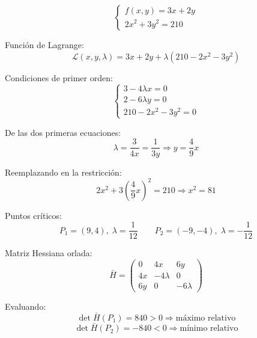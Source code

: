 \begin{Ejer}

\[
\begin{cases}
f(x,y)=3x+2y\\
2x^2+3y^2=210
\end{cases}
\]

Funci\'on de Lagrange:
\[
\mathcal{L}(x,y,\lambda)=3x+2y+\lambda(210-2x^2-3y^2)
\]

Condiciones de primer orden:
\[
\begin{cases}
3-4\lambda x=0\\
2-6\lambda y=0\\
210-2x^2-3y^2=0
\end{cases}
\]

De las dos primeras ecuaciones:
\[
\lambda=\frac{3}{4x}=\frac{1}{3y} \Rightarrow y=\frac{4}{9}x
\]

Reemplazando en la restricci\'on:
\[
2x^2+3\left(\frac{4}{9}x\right)^2=210
\Rightarrow x^2=81
\]

Puntos cr\'iticos:
\[
P_1=(9,4),\;\lambda=\frac{1}{12}
\qquad
P_2=(-9,-4),\;\lambda=-\frac{1}{12}
\]

Matriz Hessiana orlada:
\[
\bar H=
\begin{pmatrix}
0 & 4x & 6y\\
4x & -4\lambda & 0\\
6y & 0 & -6\lambda
\end{pmatrix}
\]

Evaluando:
\[
\det\bar H(P_1)=840>0 \Rightarrow \text{m\'aximo relativo}
\]
\[
\det\bar H(P_2)=-840<0 \Rightarrow \text{m\'inimo relativo}
\]
\end{Ejer}

